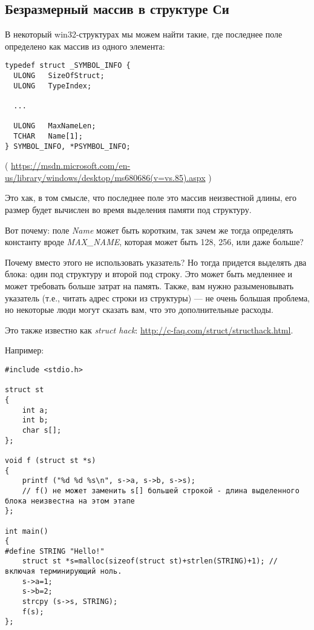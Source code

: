 \subsection{Безразмерный массив в структуре Си}

В некоторый win32-структурах мы можем найти такие, где последнее поле определено как массив из одного элемента:

\begin{lstlisting}[style=customc]
typedef struct _SYMBOL_INFO {
  ULONG   SizeOfStruct;
  ULONG   TypeIndex;
  
  ...

  ULONG   MaxNameLen;
  TCHAR   Name[1];
} SYMBOL_INFO, *PSYMBOL_INFO;
\end{lstlisting}

( \url{https://msdn.microsoft.com/en-us/library/windows/desktop/ms680686(v=vs.85).aspx} )

Это хак, в том смысле, что последнее поле это массив неизвестной длины, его размер будет вычислен во время выделения
памяти под структуру.

Вот почему: поле \emph{Name} может быть коротким, так зачем же тогда определять константу вроде \emph{MAX\_NAME},
которая может быть 128, 256, или даже больше?

Почему вместо этого не использовать указатель? Но тогда придется выделять два блока: один под структуру и второй
под строку.
Это может быть медленнее и может требовать больше затрат на память.
Также, вам нужно разыменовывать указатель (т.е., читать адрес строки из структуры) --- не очень большая проблема,
но некоторые люди могут сказать вам, что это дополнительные расходы.

Это также известно как \emph{struct hack}: \url{http://c-faq.com/struct/structhack.html}.

Например:

\begin{lstlisting}[style=customc]
#include <stdio.h>

struct st
{
	int a;
	int b;
	char s[];
};

void f (struct st *s)
{
	printf ("%d %d %s\n", s->a, s->b, s->s);
	// f() не может заменить s[] большей строкой - длина выделенного блока неизвестна на этом этапе
};

int main()
{
#define STRING "Hello!"
	struct st *s=malloc(sizeof(struct st)+strlen(STRING)+1); // включая терминирующий ноль.
	s->a=1;
	s->b=2;
	strcpy (s->s, STRING);
	f(s);
};
\end{lstlisting}

